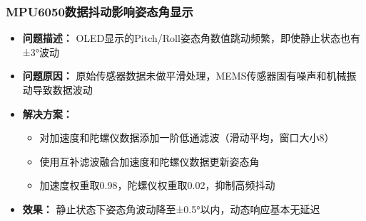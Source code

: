 \subsubsection{MPU6050数据抖动影响姿态角显示}
\begin{itemize}
    \item \textbf{问题描述：} OLED显示的Pitch/Roll姿态角数值跳动频繁，即使静止状态也有±3°波动
    \item \textbf{问题原因：} 原始传感器数据未做平滑处理，MEMS传感器固有噪声和机械振动导致数据波动
    \item \textbf{解决方案：}
    \begin{itemize}
        \item 对加速度和陀螺仪数据添加一阶低通滤波（滑动平均，窗口大小8）
        \item 使用互补滤波融合加速度和陀螺仪数据更新姿态角
        \item 加速度权重取0.98，陀螺仪权重取0.02，抑制高频抖动
    \end{itemize}
    \item \textbf{效果：} 静止状态下姿态角波动降至±0.5°以内，动态响应基本无延迟
\end{itemize}